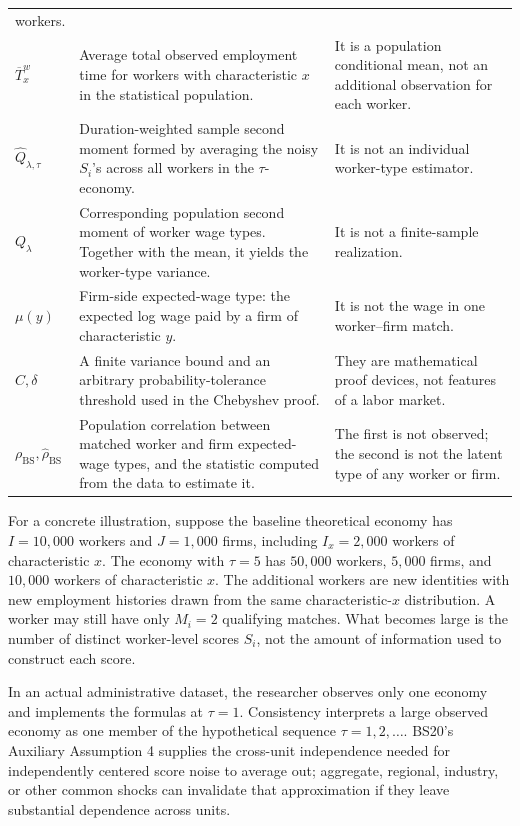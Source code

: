\documentclass[11pt]{article}
\begin{document}
\begin{longtable}{p{}p{}p{}}
workers. \\
\(\overline T_x^w\) & Average total observed employment time for workers
with characteristic \(x\) in the statistical population. & It is a
population conditional mean, not an additional observation for each worker.
\\
\(\widehat Q_{\lambda,\tau}\) & Duration-weighted sample second moment
formed by averaging the noisy \(S_i\)'s across all workers in the
\(\tau\)-economy. & It is not an individual worker-type estimator. \\
\(Q_\lambda\) & Corresponding population second moment of worker wage types.
Together with the mean, it yields the worker-type variance. & It is not a
finite-sample realization. \\
\(\mu(y)\) & Firm-side expected-wage type: the expected log wage paid by a
firm of characteristic \(y\). & It is not the wage in one worker--firm match.
\\
\(C,\delta\) & A finite variance bound and an arbitrary probability-tolerance
threshold used in the Chebyshev proof. & They are mathematical proof devices,
not features of a labor market. \\
\(\rho_{\mathrm{BS}},\widehat\rho_{\mathrm{BS}}\) & Population correlation
between matched worker and firm expected-wage types, and the statistic
computed from the data to estimate it. & The first is not observed; the
second is not the latent type of any worker or firm. \\
\end{longtable}

For a concrete illustration, suppose the baseline theoretical economy has
\(I=10{,}000\) workers and \(J=1{,}000\) firms, including
\(I_x=2{,}000\) workers of characteristic \(x\).  The economy with
\(\tau=5\) has \(50{,}000\) workers, \(5{,}000\) firms, and
\(10{,}000\) workers of characteristic \(x\).  The additional workers are
new identities with new employment histories drawn from the same
characteristic-\(x\) distribution.  A worker may still have only
\(M_i=2\) qualifying matches.  What becomes large is the number of distinct
worker-level scores \(S_i\), not the amount of information used to construct
each score.

In an actual administrative dataset, the researcher observes only one
economy and implements the formulas at \(\tau=1\).  Consistency interprets a
large observed economy as one member of the hypothetical sequence
\(\tau=1,2,\ldots\).  BS20's Auxiliary Assumption 4 supplies the
cross-unit independence needed for independently centered score noise to
average out; aggregate, regional, industry, or other common shocks can
invalidate that approximation if they leave substantial dependence across
units.
\end{document}
